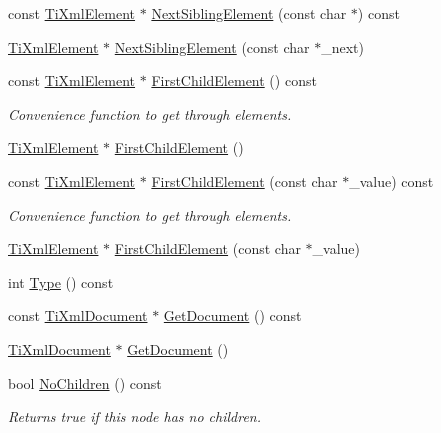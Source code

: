 \begin{DoxyCompactItemize}
\item 
const \hyperlink{class_ti_xml_element}{Ti\+Xml\+Element} $\ast$ \hyperlink{class_ti_xml_node_a22def4746238abaee042f99b47ef3c94}{Next\+Sibling\+Element} (const char $\ast$) const
\item 
\hyperlink{class_ti_xml_element}{Ti\+Xml\+Element} $\ast$ \hyperlink{class_ti_xml_node_a6e1ac6b800e18049bc75e9f8e63a8e5f}{Next\+Sibling\+Element} (const char $\ast$\+\_\+next)
\item 
const \hyperlink{class_ti_xml_element}{Ti\+Xml\+Element} $\ast$ \hyperlink{class_ti_xml_node_a12c973e1da9e90a178924b8ea5a5f4d1}{First\+Child\+Element} () const
\begin{DoxyCompactList}\small\item\em Convenience function to get through elements. \end{DoxyCompactList}\item 
\hyperlink{class_ti_xml_element}{Ti\+Xml\+Element} $\ast$ \hyperlink{class_ti_xml_node_aa0fecff1f3866ab33a8a25506e95db1d}{First\+Child\+Element} ()
\item 
const \hyperlink{class_ti_xml_element}{Ti\+Xml\+Element} $\ast$ \hyperlink{class_ti_xml_node_aab23fca4c2455c1d926c35d85a663842}{First\+Child\+Element} (const char $\ast$\+\_\+value) const
\begin{DoxyCompactList}\small\item\em Convenience function to get through elements. \end{DoxyCompactList}\item 
\hyperlink{class_ti_xml_element}{Ti\+Xml\+Element} $\ast$ \hyperlink{class_ti_xml_node_a6936ae323675071808ac4840379e57f5}{First\+Child\+Element} (const char $\ast$\+\_\+value)
\item 
int \hyperlink{class_ti_xml_node_a0f4dd916b2afc2ab2f1a84f3e2b8fd5d}{Type} () const
\item 
const \hyperlink{class_ti_xml_document}{Ti\+Xml\+Document} $\ast$ \hyperlink{class_ti_xml_node_adcb070acefcbaedaa0673d82e530538b}{Get\+Document} () const
\item 
\hyperlink{class_ti_xml_document}{Ti\+Xml\+Document} $\ast$ \hyperlink{class_ti_xml_node_a7b2372c0e7adfb32f5b6902fe49a39b2}{Get\+Document} ()
\item 
bool \hyperlink{class_ti_xml_node_abe85e0ec04ea59c033f324c8504653e5}{No\+Children} () const
\begin{DoxyCompactList}\small\item\em Returns true if this node has no children. \end{DoxyCompactList}\item 

\end{DoxyCompactItemize}
